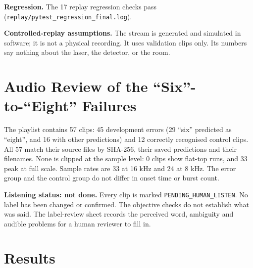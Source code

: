 \documentclass{article}
\begin{document}
\textbf{Regression.} The 17 replay regression checks pass (\texttt{replay/pytest\_regression\_final.log}).

\textbf{Controlled-replay assumptions.} The stream is generated and simulated in software; it is not a physical recording. It uses validation clips only. Its numbers say nothing about the laser, the detector, or the room.

\section{Audio Review of the ``Six''-to-``Eight'' Failures}\label{sec:audio}
The playlist contains 57 clips: 45 development errors (29 ``six'' predicted as ``eight'', and 16 with other predictions) and 12 correctly recognised control clips. All 57 match their source files by SHA-256, their saved predictions and their filenames. None is clipped at the sample level: 0 clips show flat-top runs, and 33 peak at full scale. Sample rates are 33 at 16 kHz and 24 at 8 kHz. The error group and the control group do not differ in onset time or burst count.

\textbf{Listening status: not done.} Every clip is marked \texttt{PENDING\_HUMAN\_LISTEN}. No label has been changed or confirmed. The objective checks do not establish what was said. The label-review sheet records the perceived word, ambiguity and audible problems for a human reviewer to fill in.

\section{Results}
\end{document}
